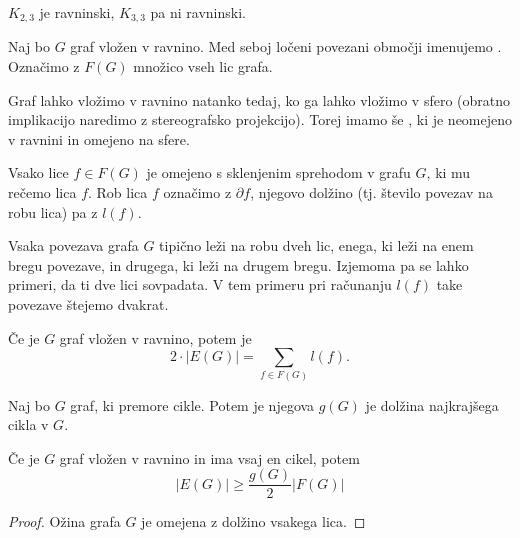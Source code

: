 \begin{primer}
    $K_{2,3}$ je ravninski, $K_{3,3}$ pa ni ravninski.
\end{primer}

\begin{definicija}
    Naj bo $G$ graf vložen v ravnino. Med seboj ločeni povezani območji imenujemo . Označimo z $F(G)$ množico vseh lic grafa.
\end{definicija}

\begin{opomba}
    Graf lahko vložimo v ravnino natanko tedaj, ko ga lahko vložimo v sfero (obratno implikacijo naredimo z stereografsko projekcijo). Torej imamo še , ki je neomejeno v ravnini in omejeno na sfere.
\end{opomba}

\begin{definicija}
    Vsako lice $f \in F(G)$ je omejeno s sklenjenim sprehodom v grafu $G$, ki mu rečemo  lica $f$. Rob lica $f$ označimo z $\partial f$, njegovo dolžino (tj. število povezav na robu lica) pa z $l(f)$.
\end{definicija}

\begin{opomba}
    Vsaka povezava grafa $G$ tipično leži na robu dveh lic, enega, ki leži na enem bregu povezave, in drugega, ki leži na drugem bregu. Izjemoma pa se lahko primeri, da ti dve lici sovpadata. V tem primeru pri računanju $l(f)$ take povezave štejemo dvakrat.
\end{opomba}

\begin{trditev}
    Če je $G$ graf vložen v ravnino, potem je $$2 \cdot |E(G)| = \sum_{f \in F(G)} l(f).$$
\end{trditev}

\begin{definicija}
    Naj bo $G$ graf, ki premore cikle. Potem je njegova  $g(G)$ je dolžina najkrajšega cikla v $G$.
\end{definicija}

\begin{trditev}
    Če je $G$ graf vložen v ravnino in ima vsaj en cikel, potem 
    $$|E(G)| \geq \frac{g(G)}{2}|F(G)|$$
\end{trditev}

\begin{proof}
    Ožina grafa $G$ je omejena z dolžino vsakega lica.
\end{proof}

